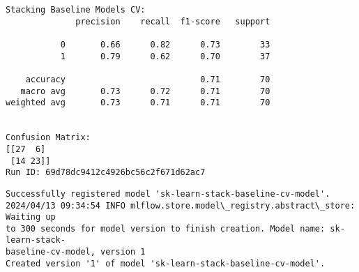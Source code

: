 \documentclass[11pt]{article}
\begin{document}
    \begin{Verbatim}[commandchars=\\\{\}]
Stacking Baseline Models CV:
              precision    recall  f1-score   support

           0       0.66      0.82      0.73        33
           1       0.79      0.62      0.70        37

    accuracy                           0.71        70
   macro avg       0.73      0.72      0.71        70
weighted avg       0.73      0.71      0.71        70


Confusion Matrix:
[[27  6]
 [14 23]]
Run ID: 69d78dc9412c4926bc56c2f671d62ac7
    \end{Verbatim}

    \begin{Verbatim}[commandchars=\\\{\}]
Successfully registered model 'sk-learn-stack-baseline-cv-model'.
2024/04/13 09:34:54 INFO mlflow.store.model\_registry.abstract\_store: Waiting up
to 300 seconds for model version to finish creation. Model name: sk-learn-stack-
baseline-cv-model, version 1
Created version '1' of model 'sk-learn-stack-baseline-cv-model'.
    \end{Verbatim}
\end{document}

